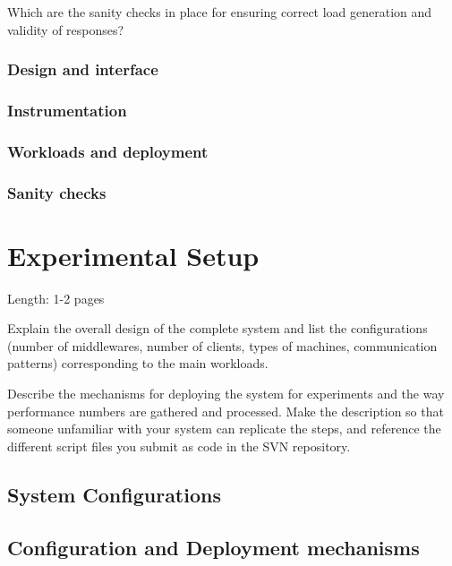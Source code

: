 \documentclass[11pt]{article}
\begin{document}
Which are the sanity checks in place for ensuring correct load
generation and validity of responses?

\subsubsection{Design and interface}\label{sec:design-and-interface}

\subsubsection{Instrumentation}\label{sec:instrumentation}

\subsubsection{Workloads and deployment}\label{sec:workloads-and-deployment}

\subsubsection{Sanity checks}\label{sec:sanity-checks}

\section{Experimental Setup}\label{sec:experimental-setup}

Length: 1-2 pages

Explain the overall design of the complete system and list the
configurations (number of middlewares, number of clients, types of
machines, communication patterns) corresponding to the main workloads.

Describe the mechanisms for deploying the system for experiments and the
way performance numbers are gathered and processed. Make the description
so that someone unfamiliar with your system can replicate the steps, and
reference the different script files you submit as code in the SVN
repository.

\subsection{System Configurations}\label{sec:system-configurations}

\subsection{Configuration and Deployment mechanisms}\label{sec:configuration-and-deployment-mechanisms}
\end{document}

